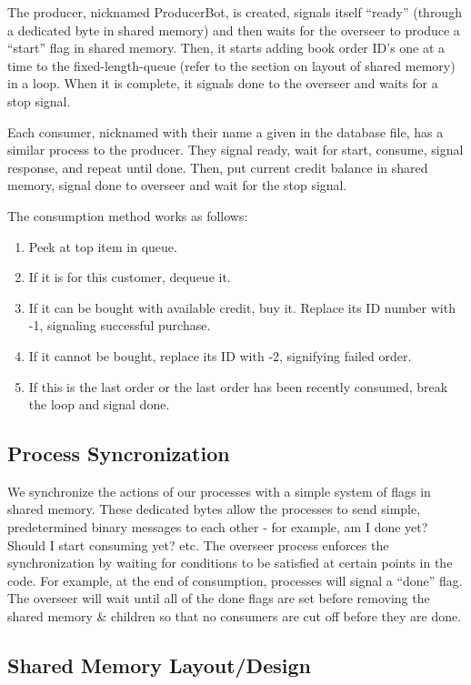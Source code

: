 \documentclass{article}
\begin{document}
The producer, nicknamed ProducerBot, is created, signals itself ``ready'' (through a dedicated byte in shared memory) and then waits for the overseer to produce a ``start'' flag in shared memory. Then, it starts adding book order ID's one at a time to the fixed-length-queue (refer to the section on layout of shared memory) in a loop. When it is complete, it signals done to the overseer and waits for a stop signal.

Each consumer, nicknamed with their name a given in the database file, has a similar process to the producer. They signal ready, wait for start, consume, signal response, and repeat until done. Then, put current credit balance in shared memory, signal done to overseer and wait for the stop signal. 

The consumption method works as follows:
\begin{enumerate}
\item Peek at top item in queue.
\item If it is for this customer, dequeue it.
\item If it can be bought with available credit, buy it. Replace its ID number with -1, signaling successful purchase.
\item If it cannot be bought, replace its ID with -2, signifying failed order.
\item If this is the last order or the last order has been recently consumed, break the loop and signal done.
\end{enumerate}

\subsection*{Process Syncronization}

We synchronize the actions of our processes with a simple system of flags in shared memory. These dedicated bytes allow the processes to send simple, predetermined binary messages to each other - for example, am I done yet? Should I start consuming yet? etc. The overseer process enforces the synchronization by waiting for conditions to be satisfied at certain points in the code. For example, at the end of consumption, processes will signal a ``done'' flag. The overseer will wait until all of the done flags are set before removing the shared memory \& children so that no consumers are cut off before they are done.

\subsection*{Shared Memory Layout/Design}
\end{document}
